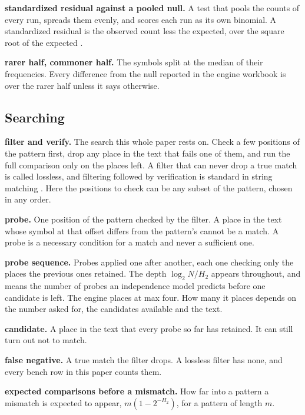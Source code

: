 \noindent\textbf{standardized residual against a pooled null.} A test that pools the counts of every run, spreads them evenly, and scores each run as its own binomial. A standardized residual is the observed count less the expected, over the square root of the expected \cite{src:Haberman-1973}.

\noindent\textbf{rarer half, commoner half.} The symbols split at the median of their frequencies. Every difference from the null reported in the engine workbook \cite{src:Quigg-orior-workbook} is over the rarer half unless it says otherwise.

\subsection{Searching}

\noindent\textbf{filter and verify.} The search this whole paper rests on. Check a few positions of the pattern first, drop any place in the text that fails one of them, and run the full comparison only on the places left. A filter that can never drop a true match is called lossless, and filtering followed by verification is standard in string matching \cite{src:Navarro}. Here the positions to check can be any subset of the pattern, chosen in any order.

\noindent\textbf{probe.} One position of the pattern checked by the filter. A place in the text whose symbol at that offset differs from the pattern's cannot be a match. A probe is a necessary condition for a match and never a sufficient one.

\noindent\textbf{probe sequence.} Probes applied one after another, each one checking only the places the previous ones retained. The depth \(\log_2 N / H_2\) appears throughout, and means the number of probes an independence model predicts before one candidate is left. The engine places at max four. How many it places depends on the number asked for, the candidates available and the text.

\noindent\textbf{candidate.} A place in the text that every probe so far has retained. It can still turn out not to match.

\noindent\textbf{false negative.} A true match the filter drops. A lossless filter has none, and every bench row in this paper counts them.

\noindent\textbf{expected comparisons before a mismatch.} How far into a pattern a mismatch is expected to appear, \(m(1-2^{-H_2})\), for a pattern of length \(m\).

